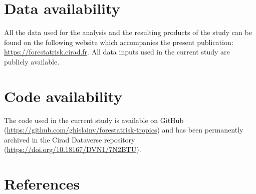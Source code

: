 \documentclass[
  12pt,
]{article}
\begin{document}
\section{Data availability}

All the data used for the analysis and the resulting products of the study can be found on the following website which accompanies the present publication: \url{https://forestatrisk.cirad.fr}. All data inputs used in the current study are publicly available.

\section{Code availability}

The code used in the current study is available on GitHub (\url{https://github.com/ghislainv/forestatrisk-tropics}) and has been permanently archived in the Cirad Dataverse repository (\url{https://doi.org/10.18167/DVN1/7N2BTU}).

\nolinenumbers
\newpage

\section{References}

\makeatletter
\apptocmd{\thebibliography}{\global\c@NAT@ctr 53\relax}{}{}
\makeatother
\end{document}
